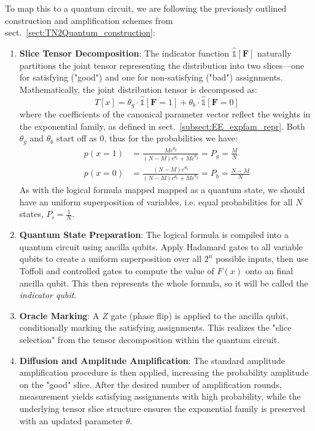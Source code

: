 \documentclass[encoding=utf8,british]{tumphthesis}
\begin{document}
        To map this to a quantum circuit, we are following the previously outlined construction and amplification schemes from sect.~\ref{sect:TN2Quantum_construction}:
        \begin{enumerate}
            \item \textbf{Slice Tensor Decomposition}: The indicator function $\hat{\mathbb{1}}[\textbf{F}]$ naturally partitions the joint tensor representing the distribution into two 
            slices—one for satisfying ("good") and one for non-satisfying ("bad") assignments. Mathematically, the joint distribution tensor is decomposed as:
            \[
            T[x] = \theta_g \cdot \hat{\mathbb{1}}[\textbf{F} = 1] + \theta_b \cdot \hat{\mathbb{1}}[\textbf{F} = 0]
            \]
            where the coefficients of the canonical parameter vector reflect the weights in the exponential family, as defined in sect.~\ref{subsect:EE_expfam_repr}.
            Both $\theta_g$ and $\theta_b$ start off as 0, thus for the probabilities we have:
            \begin{align*}
                p(x = 1) &= \frac{Me^{\theta_g}}{(N - M)e^{\theta_b} + Me^{\theta_g}} = P_g = \frac{M}{N}   \\
                p(x = 0) &= \frac{(N-M)e^{\theta_b}}{(N - M)e^{\theta_b} + Me^{\theta_g}} = P_b = \frac{N-M}{N}
            \end{align*}
            As with the logical formula mapped mapped as a quantum state, we should have an uniform superposition of variables, i.e. equal probabilities for all $N$ states, $P_i = \frac{1}{N}$. 
            \item \textbf{Quantum State Preparation}: The logical formula is compiled into a quantum circuit using ancilla qubits. Apply Hadamard gates to all variable qubits to create a 
            uniform superposition over all $2^n$ possible inputs, then use Toffoli and controlled gates to compute the value of $F(x)$ onto an final ancilla qubit. This then represents the whole formula, 
            so it will be called the \textit{indicator qubit}.
            \item \textbf{Oracle Marking}: A $Z$ gate (phase flip) is applied to the ancilla qubit, conditionally marking the satisfying assignments. 
            This realizes the "slice selection" from the tensor decomposition within the quantum circuit.
            \item \textbf{Diffusion and Amplitude Amplification}: The standard amplitude amplification procedure is then applied, increasing the probability amplitude on the "good" slice. 
            After the desired number of amplification rounds, measurement yields satisfying assignments with high probability, while the underlying tensor slice structure ensures the 
            exponential family is preserved with an updated parameter $\theta$.
        \end{enumerate}
\end{document}
